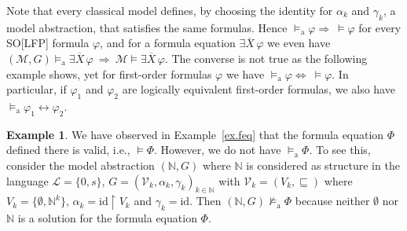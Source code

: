 \documentclass[acmsmall]{acmart}
\theoremstyle{plain}
\theoremstyle{definition}
\newtheorem{example}[theorem]{Example}
\newcommand{\calL}{\mathcal{L}}
\newcommand{\calM}{\mathcal{M}}
\newcommand{\mybar}[1]{\overline{#1}}
\newcommand{\Nat}{\mathbb{N}}
\newcommand{\id}{{\mathrm{id}}}
\newcommand{\modelsa}{\models_\mathrm{a}} %
\newcommand{\nmodelsa}{\not\models_\mathrm{a}} %
\begin{document}
Note that every classical model defines, by choosing the identity for
 $\alpha_k$ and $\gamma_k$, a model abstraction, that satisfies the
 same formulas.
Hence $\modelsa \varphi \Rightarrow~ \models \varphi$ for every SO[LFP]
 formula $\varphi$, and for a formula equation $\exists \mybar{X}\, \varphi$ we even have
 $(\calM, G) \modelsa \exists \mybar{X}\, \varphi~ \Rightarrow~ \calM \models \exists \mybar{X}\, \varphi$.
 The converse is not true as the following example shows,  yet for first-order
 formulas $\varphi$ we have $\modelsa \varphi \Leftrightarrow~ \models \varphi$.
In particular, if $\varphi_1$ and $\varphi_2$ are logically equivalent
 first-order formulas, we also have
 $\modelsa \varphi_1 \leftrightarrow \varphi_2$.
%
\begin{example}
We have observed in Example~\ref{ex.feq} that the formula equation $\Phi$ defined there
 is valid, i.e., $\models \Phi$.
However, we do not have $\modelsa \Phi$.
To see this, consider the model abstraction $(\Nat, G)$ where $\Nat$ is considered
 as structure in the language $\calL = \{ 0, s \}$, $G = (\mathcal{V}_k,\alpha_k,\gamma_k)_{k \in \Nat}$ with $\mathcal{V}_k = (V_k,\sqsubseteq)$ where $V_k = \{ \emptyset, \Nat^k \}$,
 $\alpha_k = \id \restriction V_k$ and $\gamma_k = \id$.
Then $(\Nat,G) \nmodelsa \Phi$ because neither $\emptyset$ nor $\Nat$ is a solution
 for the formula equation $\Phi$.
\end{example}
\end{document}
